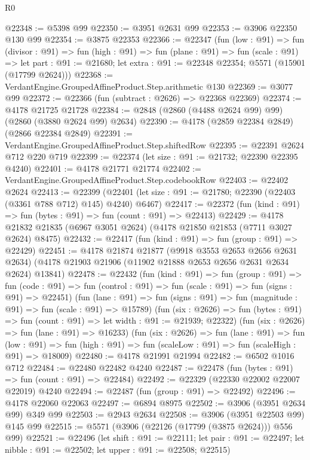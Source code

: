 \begin{lexlean}{R0}
\begin{coremodule}
@22348 := @5398 @99
@22350 := @3951 @2631 @99
@22353 := @3906 @22350 @130 @99
@22354 := @3875 @22353
@22366 := @22347
    (fun (low : @91) =>
    fun (divisor : @91) =>
    fun (high : @91) =>
    fun (plane : @91) =>
    fun (scale : @91) =>
    let part : @91 := @21680; let extra : @91 := @22348 @22354; @5571 (@15901 (@17799 @2624)))
@22368 := VerdantEngine.GroupedAffineProduct.Step.arithmetic @130
@22369 := @3077 @99
@22372 := @22366 (fun (subtract : @2626) => @22368 @22369)
@22374 := @4178 @21725 @21728
@22384 := @2848 (@2860 (@4488 @2624 @99) @99) (@2860 (@3880 @2624 @99) @2634)
@22390 := @4178 (@2859 @22384 @2849) (@2866 @22384 @2849)
@22391 := VerdantEngine.GroupedAffineProduct.Step.shiftedRow
@22395 := @22391 @2624 @712 @220 @719
@22399 := @22374 (let size : @91 := @21732; @22390 @22395 @4240)
@22401 := @4178 @21771 @21774
@22402 := VerdantEngine.GroupedAffineProduct.Step.codebookRow
@22403 := @22402 @2624
@22413 := @22399
    (@22401 (let size : @91 := @21780; @22390 (@22403 (@3361 @788 @712) @145) @4240) @6467)
@22417 := @22372 (fun (kind : @91) => fun (bytes : @91) => fun (count : @91) => @22413)
@22429 := @4178 @21832 @21835 (@6967 @3051 @2624) (@4178 @21850 @21853 (@7711 @3027 @2624) @8475)
@22432 := @22417 (fun (kind : @91) => fun (group : @91) => @22429)
@22451 := @4178
    @21874
    @21877
    (@9918 @3553 @2653 @2656 @2631 @2634)
    (@4178 @21903 @21906 (@11902 @21888 @2653 @2656 @2631 @2634 @2624) @13841)
@22478 := @22432
    (fun (kind : @91) =>
    fun (group : @91) =>
    fun (code : @91) => fun (control : @91) => fun (scale : @91) => fun (signs : @91) => @22451)
    (fun (lane : @91) => fun (signs : @91) => fun (magnitude : @91) => fun (scale : @91) => @15789)
    (fun (six : @2626) =>
    fun (bytes : @91) => fun (count : @91) => let width : @91 := @21939; @22322)
    (fun (six : @2626) => fun (lane : @91) => @16233)
    (fun (six : @2626) =>
    fun (lane : @91) =>
    fun (low : @91) => fun (high : @91) => fun (scaleLow : @91) => fun (scaleHigh : @91) => @18009)
@22480 := @4178 @21991 @21994
@22482 := @6502 @1016 @712
@22484 := @22480 @22482 @4240
@22487 := @22478 (fun (bytes : @91) => fun (count : @91) => @22484)
@22492 := @22329 (@22330 @22002 @22007 @22019) @4240
@22494 := @22487 (fun (group : @91) => @22492)
@22496 := @4178 @22060 @22063
@22497 := @6894 @8975
@22502 := @3906 (@3951 @2634 @99) @349 @99
@22503 := @2943 @2634
@22508 := @3906 (@3951 @22503 @99) @145 @99
@22515 := @5571 (@3906 (@22126 (@17799 (@3875 @2624))) @556 @99)
@22521 := @22496
    (let shift : @91 := @22111;
    let pair : @91 := @22497; let nibble : @91 := @22502; let upper : @91 := @22508; @22515)

\end{coremodule}
\end{lexlean}

